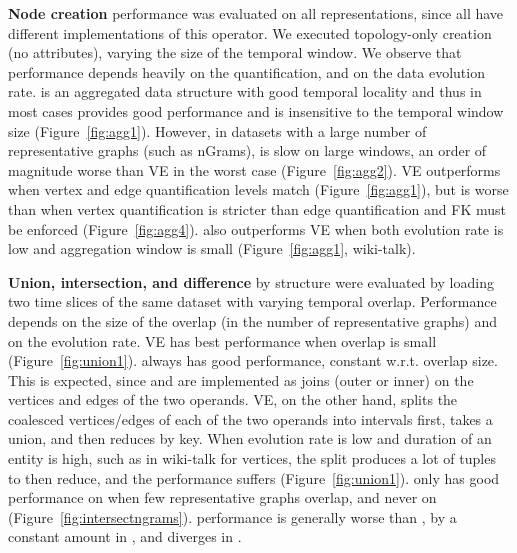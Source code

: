 {\bf Node creation} performance was evaluated on all representations,
since all have different implementations of this operator.  We
executed topology-only creation (no attributes), varying the size
of the temporal window.  We observe that performance depends heavily
on the quantification, and on the data evolution rate.  \og is an
aggregated data structure with good temporal locality and thus in most
cases provides good performance and is insensitive to the temporal
window size (Figure~\ref{fig:agg1}).  However, in datasets with a
large number of representative graphs (such as nGrams), \og is slow on
large windows, an order of magnitude worse than VE in the worst case
(Figure~\ref{fig:agg2}).  VE outperforms \og when vertex and edge
quantification levels match (Figure~\ref{fig:agg1}), but is worse than
\og when vertex quantification is stricter than edge quantification
and FK must be enforced (Figure~\ref{fig:agg4}).  \og also outperforms
VE when both evolution rate is low and aggregation window is small
(Figure~\ref{fig:agg1}, wiki-talk).

{\bf Union, intersection, and difference} by structure were evaluated
by loading two time slices of the same dataset with varying temporal
overlap.  Performance depends on the size of the overlap (in the
number of representative graphs) and on the evolution rate.  VE has
best performance when overlap is small (Figure~\ref{fig:union1}).  \og always has good
performance, constant w.r.t. overlap size.  This is expected, since
\og {} and  are implemented as joins
(outer or inner) on the vertices and edges of the two operands.  VE,
on the other hand, splits the coalesced vertices/edges of each of the
two operands into intervals first, takes a union, and then reduces by
key.  When evolution rate is low and duration of an entity is high,
such as in wiki-talk for vertices, the split produces a lot of tuples
to then reduce, and the performance suffers
(Figure~\ref{fig:union1}). \sg only has good performance on
 when few representative graphs overlap, and never
on  (Figure~\ref{fig:intersectngrams}). \hg performance
is generally worse than \og, by a constant amount in ,
and diverges in .  

